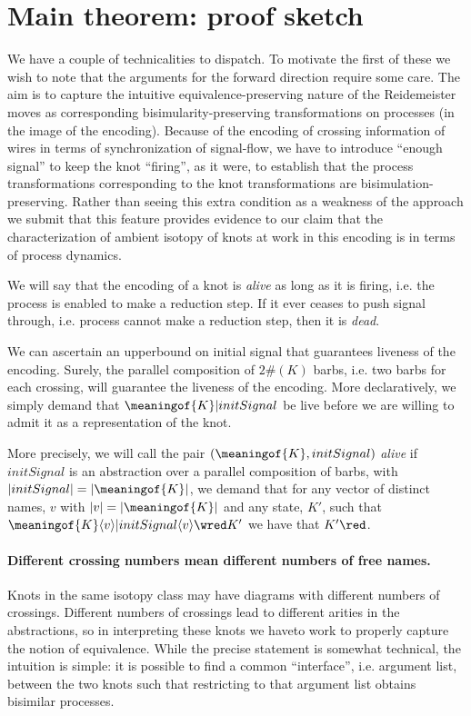 \section{Main theorem: proof sketch}\label{sub:main_thm_proof_sketch} %

We have a couple of technicalities to dispatch. To motivate the
first of these we wish to note that the arguments for the
forward direction require some care. The aim is to capture the
intuitive equivalence-preserving nature of the Reidemeister moves as
corresponding bisimularity-preserving transformations on processes (in
the image of the encoding). Because of the encoding of crossing
information of wires in terms of synchronization of signal-flow, we
have to introduce ``enough signal'' to keep the knot ``firing'', as it
were, to establish that the process transformations corresponding
to the knot transformations are bisimulation-preserving. Rather than
seeing this extra condition as a weakness of the approach we submit that this feature
provides evidence to our claim that the characterization of ambient isotopy of knots at
work in this encoding is in terms of process dynamics.

We will say that the encoding of a knot is \emph{alive} as long as it
is firing, i.e. the process is enabled to make a reduction step. If it
ever ceases to push signal through, i.e. process cannot make a
reduction step, then it is \emph{dead}.
  
We can ascertain an upperbound on initial signal that guarantees
liveness of the encoding. Surely, the parallel composition of $2\#(K)$
barbs, i.e. two barbs for each crossing, will guarantee the liveness
of the encoding. More declaratively, we simply demand that $
\meaningof{K} | initSignal$ be live before we are willing to admit
it as a representation of the knot.

\begin{definition}
  More precisely, we will call the pair
  $(\meaningof{K},initSignal)$ \emph{alive} if $initSignal$ is
  an abstraction over a parallel composition of barbs, with
  $|initSignal| = |\meaningof{K}|$, we demand that for any vector
  of distinct names, $v$ with $|v| = |\meaningof{K}|$ and any state,
  $K'$, such that $\meaningof{K}\langle v \rangle | initSignal
  \langle v \rangle \wred K'$ we have that $K' \red$.
\end{definition}

\paragraph*{Different crossing numbers mean different numbers of free
  names.}
Knots in the same isotopy class may have diagrams with different numbers of
crossings. Different numbers of crossings lead to different arities
in the abstractions, so in interpreting these knots we haveto work to properly capture the notion of equivalence. While the precise statement
is somewhat technical, the intuition is simple: it is possible to find
a common ``interface'', i.e. argument list, between the two knots such
that restricting to that argument list obtains bisimilar processes.

